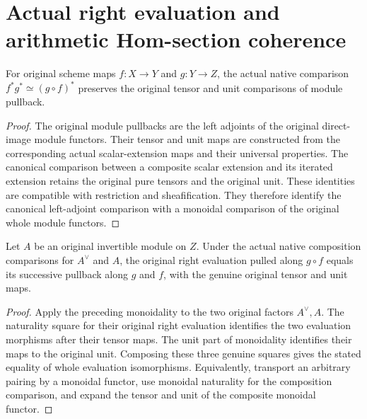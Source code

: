\section{Actual right evaluation and arithmetic Hom-section coherence}

\begin{lemma}
\label{lem:kn-original-line-native-pullback-monoidal}
\leanok
For original scheme maps $f:X\to Y$ and $g:Y\to Z$, the actual native
comparison $f^*g^*\simeq(g\circ f)^*$ preserves the original tensor
and unit comparisons of module pullback.
\end{lemma}
\begin{proof}
The original module pullbacks are the left adjoints of the original
direct-image module functors.  Their tensor and unit maps are constructed
from the corresponding actual scalar-extension maps and their universal
properties.  The canonical comparison between a composite scalar extension
and its iterated extension retains the original pure tensors and the original
unit.  These identities are compatible with restriction and sheafification.
They therefore identify the canonical left-adjoint comparison with a
monoidal comparison of the original whole module functors.
\end{proof}

\begin{lemma}
\label{lem:kn-original-line-right-evaluation-comp}
\leanok
{}
Let $A$ be an original invertible module on $Z$.  Under the actual native
composition comparisons for $A^\vee$ and $A$, the original right evaluation
pulled along $g\circ f$ equals its successive pullback along $g$ and $f$,
with the genuine original tensor and unit maps.
\end{lemma}
\begin{proof}
Apply the preceding monoidality to the two original factors $A^\vee,A$.
The naturality square for their original right evaluation identifies the
two evaluation morphisms after their tensor maps.  The unit part of
monoidality identifies their maps to the original unit.  Composing these
three genuine squares gives the stated equality of whole evaluation
isomorphisms.  Equivalently, transport an arbitrary pairing by a monoidal
functor, use monoidal naturality for the composition comparison, and expand
the tensor and unit of the composite monoidal functor.
\end{proof}

